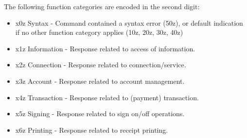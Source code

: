 The following function categories are encoded in the second digit:
\begin{itemize}
\item x0z Syntax - Command contained a syntax error (50z), or default indication if no other function category applies (10z, 20z, 30z, 40z)
\item x1z Information - Response related to access of information.
\item x2z Connection - Response related to connection/service.
\item x3z Account - Response related to account management.
\item x4z Transaction - Response related to (payment) transaction.
\item x5z Signing - Response related to sign on/off operations.
\item x6z Printing - Response related to receipt printing.
\end{itemize}

